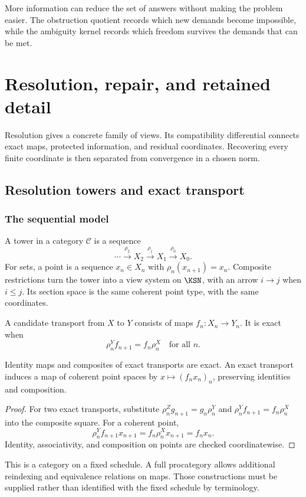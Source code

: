 \begin{insight}
More information can reduce the set of answers without making the problem easier. The obstruction quotient records which new demands become impossible, while the ambiguity kernel records which freedom survives the demands that can be met.
\end{insight}




\chapter{Resolution, repair, and retained detail}\label{KS:book:chapter-20}
Resolution gives a concrete family of views. Its compatibility differential connects exact maps, protected information, and residual coordinates. Recovering every finite coordinate is then separated from convergence in a chosen norm.

\section{Resolution towers and exact transport}\label{KS:sec:towers}
\subsection{The sequential model}
A tower in a category \(\mathcal C\) is a sequence
\[
 \cdots\xrightarrow{\rho_2}X_2\xrightarrow{\rho_1}X_1
 \xrightarrow{\rho_0}X_0.
\]
For sets, a point is a sequence \(x_n\in X_n\) with \(\rho_n(x_{n+1})=x_n\). Composite restrictions turn the tower into a view system on \(\KSN\), with an arrow \(i\to j\) when \(i\le j\). Its section space is the same coherent point type, with the same coordinates.

A candidate transport from \(X\) to \(Y\) consists of maps \(f_n:X_n\to Y_n\). It is exact when
\begin{equation}\label{KS:eq:exacttower}
 \rho^Y_n f_{n+1}=f_n\rho^X_n\quad\text{for all }n.
\end{equation}

\begin{KSproposition}\label{KS:KS16}
Identity maps and composites of exact transports are exact. An exact transport induces a map of coherent point spaces by \(x\mapsto(f_nx_n)_n\), preserving identities and composition.
\end{KSproposition}
\begin{proof}
For two exact transports, substitute \(\rho^Z_ng_{n+1}=g_n\rho^Y_n\) and \(\rho^Y_nf_{n+1}=f_n\rho^X_n\) into the composite square. For a coherent point,
\[
 \rho^Y_n f_{n+1}x_{n+1}
 =f_n\rho^X_nx_{n+1}=f_nx_n.
\]
Identity, associativity, and composition on points are checked coordinatewise.
\end{proof}
This is a category on a fixed schedule. A full procategory allows additional reindexing and equivalence relations on maps. Those constructions must be supplied rather than identified with the fixed schedule by terminology.

